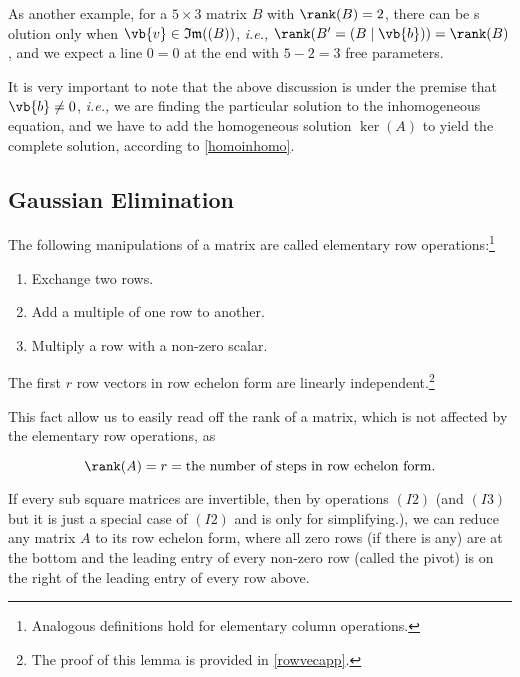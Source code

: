 \documentclass[a4paper,12pt]{report}
\begin{document}
As another example, for a \(5 \times 3\) matrix \(B\) with \(\rank (B) = 2\), there can be s olution only when \(\vb{v} \in \mathfrak{Im} ((B)) \), \textit{i.e.,} \(\rank (B' = (B \mid \vb{b} )) = \rank (B)\), and we expect a line \(0=0\) at the end with \(5-2 = 3\) free parameters.      

It is very important to note that the above discussion is under the premise that \(\vb{b} \neq 0\), \textit{i.e.,} we are finding the particular solution to the inhomogeneous equation, and we have to add the homogeneous solution \(\ker (A)\) to yield the complete solution, according to \cref{homoinhomo}.   

\subsection{Gaussian Elimination} \label{elim} 

\begin{definition}
The following manipulations of a matrix are called elementary row operations:\footnote{Analogous definitions hold for elementary column operations.}

\begin{enumerate}[label=(\(I\)\arabic*)]
    \item Exchange two rows.
    \item Add a multiple of one row to another.
    \item Multiply a row with a non-zero scalar.
\end{enumerate}

\end{definition}

\begin{lemma} \label{rowvec} 
    The first \(r\) row vectors in row echelon form are linearly independent.\footnote{The proof of this lemma is provided in \cref{rowvecapp}.}
    \end{lemma}
    
This fact allow us to easily read off the rank of a matrix, which is not affected by the elementary row operations, as

\begin{equation}
    \rank (A) = r = \text{the number of steps in row echelon form.}
\end{equation}

If every sub square matrices are invertible, then by operations \((I2)\) (and \((I3)\) but it is just a special case of \((I2)\) and is only for simplifying.), we can reduce any matrix \(A\) to its row echelon form,  where all zero rows (if there is any) are at the bottom and the leading entry of every non-zero row (called the pivot) is on the right of the leading entry of every row above. 
\end{document}
